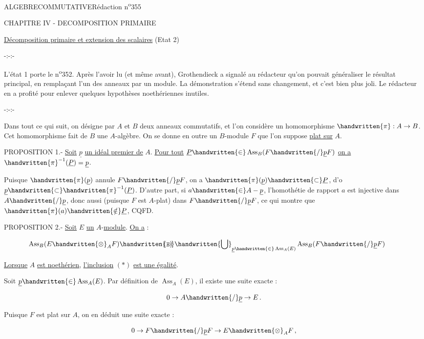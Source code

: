 \noindent\hfill ALGEBRE\quad COMMUTATIVE\hfill Rédaction n\textsuperscript{o}355

CHAPITRE IV - DECOMPOSITION PRIMAIRE

\uline{Décomposition primaire et extension des scalaires} (Etat 2)

\begin{center}-:-:-\end{center}

L'état 1 porte le n\textsuperscript{o}352. Après l'avoir lu (et même avant), Grothendieck a signalé au rédacteur qu'on pouvait généraliser le résultat principal, en remplaçant l'un des anneaux par un module. La démonstration s'étend sans changement, et c'est bien plus joli. Le rédacteur en a profité pour enlever quelques hypothèses noethériennes inutiles.

\begin{center}-:-:-\end{center}

Dans tout ce qui suit, on désigne par $A$ et $B$ deux anneaux commutatifs, et l'on considère un homomorphisme $\handwritten{\pi}:A\to B$. Cet homomorphisme fait de $B$ une $A$-algèbre. On se donne en outre un $B$-module $F$ que l'on suppose \uline{plat sur} $A$.

PROPOSITION 1.- \uline{Soit} $\underline p$ \uline{un idéal premier de} $A$. \uline{Pour tout} $\underline P\handwritten{\in}\operatorname{Ass}_B(F\handwritten{/}\underline p F)$ \uline{on a} $\handwritten{\pi}^{-1}(\underline P)=\underline p$.

Puisque $\handwritten{\pi}(\underline p)$ annule $F\handwritten{/}\underline p F$, on a $\handwritten{\pi}(\underline p)\handwritten{\subset}\underline P$, d'o $\underline p\handwritten{\subset}\handwritten{\pi}^{-1}(\underline P)$. D'autre part, si $a\handwritten{\in} A-\underline p$, l'homothétie de rapport $a$ est injective dans $A\handwritten{/}\underline p$, donc aussi (puisque $F$ est $A$-plat) dans $F\handwritten{/}\underline p F$, ce qui montre que $\handwritten{\pi}(a)\handwritten{\notin}\underline P$, CQFD.

PROPOSITION 2.- \uline{Soit} $E$ \uline{un} $A$-\uline{module}. \uline{On a} :

\[
\operatorname{Ass}_B(E\handwritten{\otimes}_A F)\handwritten{\supset}\handwritten{\bigcup}_{\underline p\handwritten{\in}\operatorname{Ass}_A(E)}\operatorname{Ass}_B(F\handwritten{/}\underline p F)
\tag*{\makebox[0pt][r]{\makebox[\linewidth][l]{$(\ast)$}}}
\]

\uline{Lorsque} $A$ \uline{est noethérien}, \uline{l'inclusion} $(\ast)$ \uline{est une égalité}.

Soit $\underline p\handwritten{\in}\operatorname{Ass}_A(E)$. Par définition de $\operatorname{Ass}_A(E)$, il existe une suite exacte :

\[
0\to A\handwritten{/}\underline p\to E\,.
\]

Puisque $F$ est plat sur $A$, on en déduit une suite exacte :

\[
0\to F\handwritten{/}\underline p F\to E\handwritten{\otimes}_A F\,,
\]

